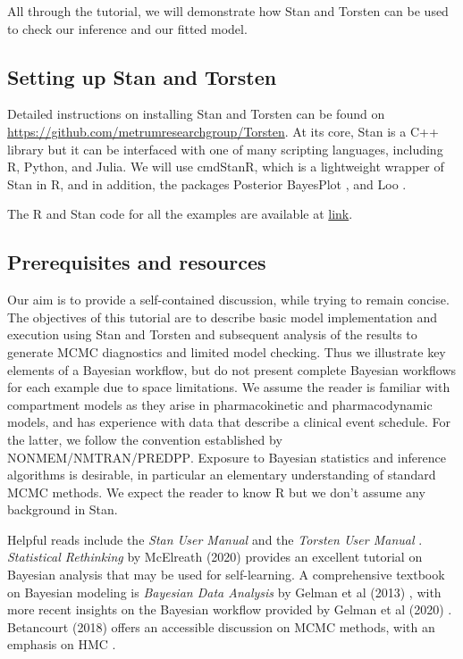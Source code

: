 All through the tutorial, we will demonstrate how Stan and Torsten can be used to check our inference and our fitted model.

\subsection{Setting up Stan and Torsten}

Detailed instructions on installing Stan and Torsten can be found on \url{https://github.com/metrumresearchgroup/Torsten}.
At its core, Stan is a C++ library but it can be interfaced with one of many scripting languages, including R, Python, and Julia.
We will use cmdStanR, which is a lightweight wrapper of Stan in R, and
in addition, the packages Posterior \cite{Bukner:2020} BayesPlot \cite{Gabry:2021}, and Loo \cite{Gabry:2020}.

The R and Stan code for all the examples are available at \url{link}.

 \subsection{Prerequisites and resources}
 
 Our aim is to provide a self-contained discussion, while trying to remain concise. 
The objectives of this tutorial are to describe basic model implementation and execution using Stan and Torsten and subsequent analysis of the results to generate MCMC diagnostics and limited model checking. Thus we illustrate key elements of a Bayesian workflow, but do not present complete Bayesian workflows for each example due to space limitations.
 We assume the reader is familiar with compartment models as they arise in pharmacokinetic and pharmacodynamic models, and has experience with data that describe a clinical event schedule.
 For the latter, we follow the convention established by NONMEM\textsuperscript{\textregistered}/NMTRAN\textsuperscript{\textregistered}/PREDPP\textsuperscript{\textregistered}.
 Exposure to Bayesian statistics and inference algorithms is desirable, in particular an elementary understanding of standard MCMC methods.
 We expect the reader to know R but we don't assume any background in Stan.
 
 Helpful reads include the \textit{Stan User Manual} \cite{Stan:2021} and the \textit{Torsten User Manual} \cite{Torsten:2021}. 
\textit{Statistical Rethinking} by McElreath (2020)\cite{mcelreath2020statistical} provides an excellent tutorial on Bayesian analysis that may be used for self-learning.
 A comprehensive textbook on Bayesian modeling is \textit{Bayesian Data Analysis} by Gelman et al (2013) \cite{Gelman:2013b}, with more recent insights on the Bayesian workflow provided by Gelman et al (2020) \cite{Gelman:2020}. 
 Betancourt (2018) offers an accessible discussion on MCMC methods, with an emphasis on HMC \cite{Betancourt:2018}.
   
 
 